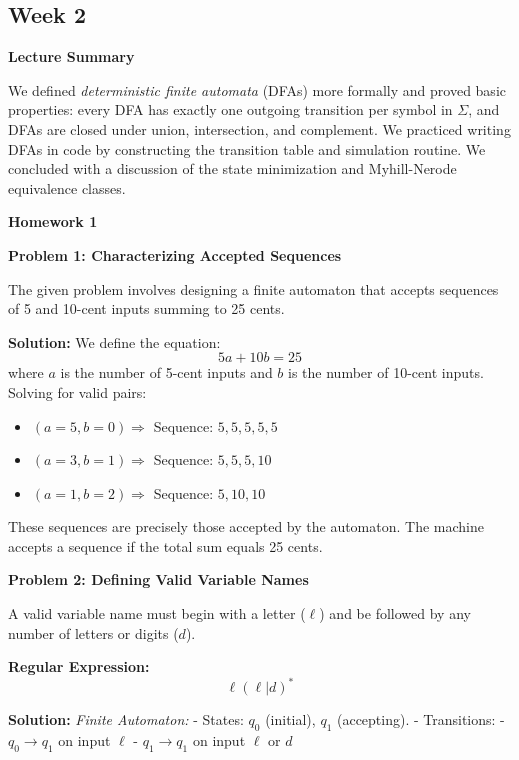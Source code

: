\documentclass{article}
\theoremstyle{theorem}
\theoremstyle{definition}
\theoremstyle{remark}
\begin{document}

\subsection{Week 2}
\textbf{Lecture Summary}

We defined \emph{deterministic finite automata} (DFAs) more formally and proved basic properties: every DFA has exactly one outgoing transition per symbol in $\Sigma$, and DFAs are closed under union, intersection, and complement.  We practiced writing DFAs in code by constructing the transition table and simulation routine.  We concluded with a discussion of the state minimization and Myhill-Nerode equivalence classes.

{\textbf{{Homework 1}}}

\textbf{Problem 1: Characterizing Accepted Sequences}

The given problem involves designing a finite automaton that accepts sequences of 5 and 10-cent inputs summing to 25 cents.

\textbf{Solution:}
We define the equation:
\begin{equation}
5a + 10b = 25
\end{equation}
where $a$ is the number of 5-cent inputs and $b$ is the number of 10-cent inputs. Solving for valid pairs:
\begin{itemize}
    \item $(a=5, b=0) \Rightarrow$ Sequence: $5,5,5,5,5$
    \item $(a=3, b=1) \Rightarrow$ Sequence: $5,5,5,10$
    \item $(a=1, b=2) \Rightarrow$ Sequence: $5,10,10$
\end{itemize}
These sequences are precisely those accepted by the automaton. The machine accepts a sequence if the total sum equals 25 cents.\newline

\textbf{Problem 2: Defining Valid Variable Names}

A valid variable name must begin with a letter ($\ell$) and be followed by any number of letters or digits ($d$).

\textbf{Regular Expression:}
\begin{equation}
\ell(\ell | d)^*
\end{equation}

\textbf{Solution:}
\textit{Finite Automaton:}
- States: $q_0$ (initial), $q_1$ (accepting).
- Transitions:
  - $q_0 \to q_1$ on input $\ell$
  - $q_1 \to q_1$ on input $\ell$ or $d$
\end{document}
